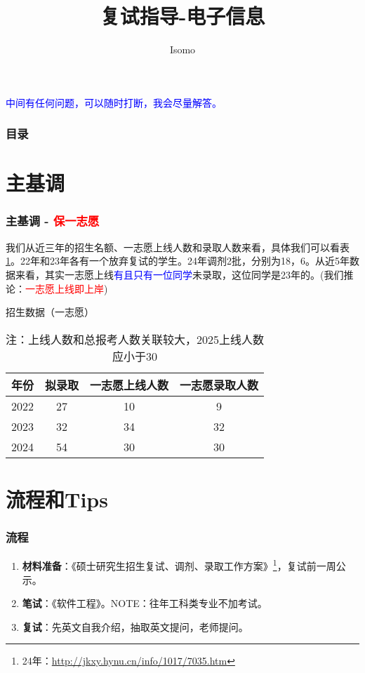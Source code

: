 \documentclass[slide]{../custom}
\title{\textbf{复试指导-电子信息}}
\author{Isomo}
\begin{document}
\begin{frame}
  \titlepage
  \footnotesize
  \textcolor{blue}{中间有任何问题，可以随时打断，我会尽量解答。}
\end{frame}

\begin{frame}
  \frametitle{目录}
  \tableofcontents
\end{frame}

\section{主基调}

\begin{frame}
  \frametitle{主基调 - \textcolor{red}{保一志愿}}
  我们从近三年的招生名额、一志愿上线人数和录取人数来看，具体我们可以看表\ref{tab:招生数据}。22年和23年各有一个放弃复试的学生。24年调剂2批，分别为18，6。从近5年数据来看，其实一志愿上线\textcolor{blue}{有且只有一位同学}未录取，这位同学是23年的。(我们推论：\textcolor{red}{一志愿上线即上岸})
  \begin{table}[htbp]
    \centering
    \caption{招生数据（一志愿）}
    \begin{tabular}{cccc}
      \toprule
      年份 & 拟录取 & 一志愿上线人数 & 一志愿录取人数 \\
      \midrule
      2022 & 27 & 10 & 9 \\
      2023 & 32 & 34 & 32 \\
      2024 & 54 & 30 & 30 \\
      \bottomrule
    \end{tabular}
    \caption*{\footnotesize 注：上线人数和总报考人数关联较大，2025上线人数应小于30}
    \label{tab:招生数据}
  \end{table}

\end{frame}

\section{流程和Tips}

\begin{frame}
  \frametitle{流程}
  \begin{enumerate}
    \item \textbf{材料准备}：《硕士研究生招生复试、调剂、录取工作方案》\footnote{24年：\url{http://jkxy.hynu.cn/info/1017/7035.htm}}，复试前一周公示。
    \item \textbf{笔试}：《软件工程》。NOTE：往年工科类专业不加考试。
    \item \textbf{复试}：先英文自我介绍，抽取英文提问，老师提问。
  \end{enumerate}
\end{frame}
\end{document}
